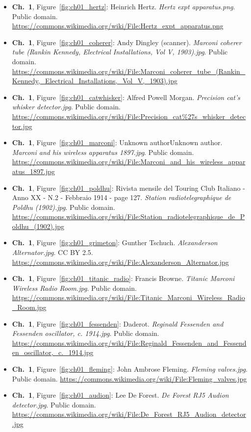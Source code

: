 \begin{small}
\begin{itemize}[leftmargin=0pt,itemsep=2pt,label={}]
\item \textbf{Ch.~1}, Figure~\ref{fig:ch01_hertz}: Heinrich Hertz. \emph{Hertz expt apparatus.\allowbreak{}png}. Public domain. \url{https://commons.wikimedia.org/wiki/File:Hertz_expt_apparatus.png}
\item \textbf{Ch.~1}, Figure~\ref{fig:ch01_coherer}: Andy Dingley (scanner). \emph{Marconi coherer tube (Rankin Kennedy, Electrical Installations, Vol V, 1903).\allowbreak{}jpg}. Public domain. \url{https://commons.wikimedia.org/wiki/File:Marconi_coherer_tube_(Rankin_Kennedy,_Electrical_Installations,_Vol_V,_1903).jpg}
\item \textbf{Ch.~1}, Figure~\ref{fig:ch01_catwhisker}: Alfred Powell Morgan. \emph{Precision cat's whisker detector.\allowbreak{}jpg}. Public domain. \url{https://commons.wikimedia.org/wiki/File:Precision_cat%27s_whisker_detector.jpg}
\item \textbf{Ch.~1}, Figure~\ref{fig:ch01_marconi}: Unknown authorUnknown author. \emph{Marconi and his wireless apparatus 1897.\allowbreak{}jpg}. Public domain. \url{https://commons.wikimedia.org/wiki/File:Marconi_and_his_wireless_apparatus_1897.jpg}
\item \textbf{Ch.~1}, Figure~\ref{fig:ch01_poldhu}: Rivista mensile del Touring Club Italiano - Anno XX - N.2 - Febbraio 1914 - page 127. \emph{Station radiotelegraphique de Poldhu (1902).\allowbreak{}jpg}. Public domain. \url{https://commons.wikimedia.org/wiki/File:Station_radiotelegraphique_de_Poldhu_(1902).jpg}
\item \textbf{Ch.~1}, Figure~\ref{fig:ch01_grimeton}: Gunther Tschuch. \emph{Alexanderson Alternator.\allowbreak{}jpg}. CC BY 2.5. \url{https://commons.wikimedia.org/wiki/File:Alexanderson_Alternator.jpg}
\item \textbf{Ch.~1}, Figure~\ref{fig:ch01_titanic_radio}: Francis Browne. \emph{Titanic Marconi Wireless Radio Room.\allowbreak{}jpg}. Public domain. \url{https://commons.wikimedia.org/wiki/File:Titanic_Marconi_Wireless_Radio_Room.jpg}
\item \textbf{Ch.~1}, Figure~\ref{fig:ch01_fessenden}: Daderot. \emph{Reginald Fessenden and Fessenden oscillator, c.\allowbreak{} 1914.\allowbreak{}jpg}. Public domain. \url{https://commons.wikimedia.org/wiki/File:Reginald_Fessenden_and_Fessenden_oscillator,_c._1914.jpg}
\item \textbf{Ch.~1}, Figure~\ref{fig:ch01_fleming}: John Ambrose Fleming. \emph{Fleming valves.\allowbreak{}jpg}. Public domain. \url{https://commons.wikimedia.org/wiki/File:Fleming_valves.jpg}
\item \textbf{Ch.~1}, Figure~\ref{fig:ch01_audion}: Lee De Forest. \emph{De Forest RJ5 Audion detector.\allowbreak{}jpg}. Public domain. \url{https://commons.wikimedia.org/wiki/File:De_Forest_RJ5_Audion_detector.jpg}

\end{itemize}
\end{small}
